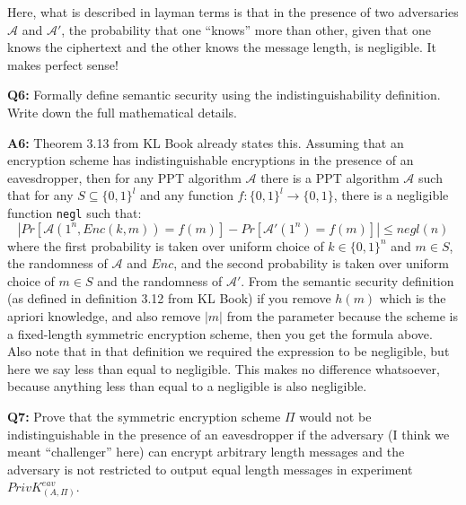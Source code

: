 \documentclass[12pt,reqno]{amsart}
\newcommand{\code}[1]{\texttt{#1}}
\newcommand{\advrs}[0]{\mathcal{A}}
\begin{document}
Here, what is described in layman terms is that in the presence of two adversaries $\advrs$ and $\advrs'$, the probability that one ``knows'' more than other, given that one knows the ciphertext and the other knows the message length, is negligible. It makes perfect sense!


\vspace{20px}
\textbf{Q6:} Formally define semantic security using the indistinguishability definition. Write down the full mathematical details. 

\textbf{A6:} Theorem 3.13 from KL Book already states this. Assuming that an encryption scheme has indistinguishable encryptions in the presence of an eavesdropper, then for any PPT algorithm $\advrs$ there is a PPT algorithm $\advrs$ such that for any $S \subseteq \{0,1\}^l$ and any function $f : \{0,1\}^l \xrightarrow{} \{0,1\}$, there is a negligible function \code{negl} such that:
$$
|Pr[\advrs(1^n, Enc(k,m))=f(m)] - Pr[\advrs'(1^n)=f(m)]| \leq negl(n)
$$
where the first probability is taken over uniform choice of $k \in \{0,1\}^n$ and $m \in S$, the randomness of $\advrs$ and $Enc$, and the second probability is taken over uniform choice of $m \in S$ and the randomness of $\advrs'$. From the semantic security definition (as defined in definition 3.12 from KL Book) if you remove $h(m)$ which is the apriori knowledge, and also remove $|m|$ from the parameter because the scheme is a fixed-length symmetric encryption scheme, then you get the formula above. Also note that in that definition we required the expression to be negligible, but here we say less than equal to negligible. This makes no difference whatsoever, because anything less than equal to a negligible is also negligible.

\vspace{20px}
\textbf{Q7:} Prove that the symmetric encryption scheme $\Pi$ would not be indistinguishable in the presence of an eavesdropper if the adversary (I think we meant ``challenger'' here) can encrypt arbitrary  length messages and the adversary is not restricted to output equal length messages in experiment $PrivK_{(A, \Pi)}^{eav}$.
\end{document}
